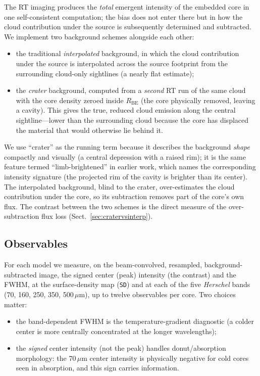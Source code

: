 \documentclass[11pt,a4paper]{article}
\newcommand{\Rbe}{R_{\mathrm{BE}}}
\begin{document}
The RT imaging produces the \emph{total} emergent intensity of the
embedded core in one self-consistent computation; the bias does not enter
there but in
how the cloud contribution under the source is subsequently determined and
subtracted. We implement two background schemes alongside each other:
\begin{itemize}
  \item the traditional \emph{interpolated} background, in which the
        cloud contribution under the source is interpolated across the
        source footprint from the surrounding cloud-only sightlines (a
        nearly flat estimate);
  \item the \emph{crater} background, computed from a \emph{second} RT run of
        the same cloud with the core density zeroed inside $\Rbe$ (the core
        physically removed, leaving a cavity). This gives the true,
        reduced cloud emission along the central sightline---lower than the
        surrounding cloud because the core has displaced the material that
        would otherwise lie behind it.
\end{itemize}
We use ``crater'' as the running term because it describes the background
\emph{shape} compactly and visually (a central depression with a raised
rim); it is the same feature termed ``limb-brightened'' in earlier work,
which names the corresponding intensity signature (the projected rim of the
cavity is brighter than its center). The interpolated background, blind to
the crater, over-estimates the cloud contribution under the core, so its
subtraction removes part of the core's own flux. The contrast between the
two schemes is the direct measure of the over-subtraction flux loss
(Sect.~\ref{sec:cratervsinterp}).

\subsection{Observables}
\label{sec:observables}

For each model we measure, on the beam-convolved, resampled, background-
subtracted image, the signed center (peak) intensity (the contrast) and the
FWHM, at the surface-density map (\texttt{SD}) and at each of the five
\emph{Herschel} bands (70, 160, 250, 350, 500\,$\mu$m), up to twelve
observables per core. Two choices matter:
\begin{itemize}
  \item the band-dependent FWHM is the temperature-gradient diagnostic
        (a colder center is more centrally concentrated at the longer
        wavelengths);
  \item the \emph{signed} center intensity (not the peak) handles
        donut/absorption morphology: the 70\,$\mu$m center intensity is
        physically negative for cold cores seen in absorption, and this
        sign carries information.
\end{itemize}
\end{document}
